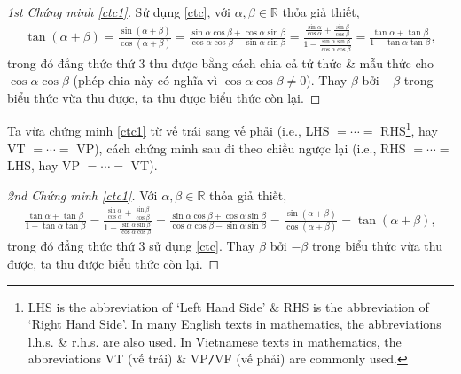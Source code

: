 \documentclass[oneside]{book}
\numberwithin{equation}{section}
\begin{document}
\begin{proof}[1st Chứng minh \eqref{ctc1}]
	Sử dụng \eqref{ctc}, với $\alpha,\beta\in\mathbb{R}$ thỏa giả thiết,
	\begin{align*}
		\tan(\alpha + \beta) = \frac{\sin(\alpha + \beta)}{\cos(\alpha + \beta)} = \frac{\sin\alpha\cos\beta + \cos\alpha\sin\beta}{\cos\alpha\cos\beta - \sin\alpha\sin\beta} = \frac{\frac{\sin\alpha}{\cos\alpha} + \frac{\sin\beta}{\cos\beta}}{1 - \frac{\sin\alpha\sin\beta}{\cos\alpha\cos\beta}} = \frac{\tan\alpha + \tan\beta}{1 - \tan\alpha\tan\beta},
	\end{align*}
	trong đó đẳng thức thứ 3 thu được bằng cách chia cả tử thức \& mẫu thức cho $\cos\alpha\cos\beta$ (phép chia này có nghĩa vì $\cos\alpha\cos\beta\ne 0$). Thay $\beta$ bởi $-\beta$ trong biểu thức vừa thu được, ta thu được biểu thức còn lại.
\end{proof}
Ta vừa chứng minh \eqref{ctc1} từ vế trái sang vế phải (i.e., LHS $= \cdots =$ RHS\footnote{LHS is the abbreviation of `Left Hand Side' \& RHS is the abbreviation of `Right Hand Side'. In many English texts in mathematics, the abbreviations l.h.s. \& r.h.s. are also used. In Vietnamese texts in mathematics, the abbreviations VT (vế trái) \& VP\texttt{/}VF (vế phải) are commonly used.}, hay VT $=\cdots =$ VP), cách chứng minh sau đi theo chiều ngược lại (i.e., RHS $= \cdots =$ LHS, hay VP $=\cdots =$ VT).

\begin{proof}[2nd Chứng minh \eqref{ctc1}]
	Với $\alpha,\beta\in\mathbb{R}$ thỏa giả thiết,
	\begin{align*}
		\frac{\tan\alpha + \tan\beta}{1 - \tan\alpha\tan\beta} = \frac{\frac{\sin\alpha}{\cos\alpha} + \frac{\sin\beta}{\cos\beta}}{1 - \frac{\sin\alpha\sin\beta}{\cos\alpha\cos\beta}} = \frac{\sin\alpha\cos\beta + \cos\alpha\sin\beta}{\cos\alpha\cos\beta - \sin\alpha\sin\beta} = \frac{\sin(\alpha + \beta)}{\cos(\alpha + \beta)} = \tan(\alpha + \beta),
	\end{align*}
	trong đó đẳng thức thứ 3 sử dụng \eqref{ctc}. Thay $\beta$ bởi $-\beta$ trong biểu thức vừa thu được, ta thu được biểu thức còn lại.
\end{proof}
\end{document}
